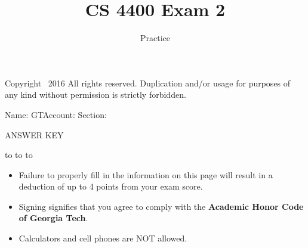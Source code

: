 \documentclass[10pt,a4paper]{exam}
\title{CS 4400 Exam 2}
\date{Practice}
\begin{document}
\maketitle
\thispagestyle{empty}
\firstpageheader{}               {\tiny Copyright \textcopyright\ 2016 All rights reserved. Duplication and/or usage for purposes of any kind without permission is strictly forbidden.}
                {}


\runningheader{}
{\small Name: \underline{\hspace{2.8in}} GTAccount: \underline{\hspace{1.4in}} Section: \underline{\hspace{.5in}}}
{}



\ifprintanswers
\begin{center}
{\LARGE ANSWER KEY}
\end{center}
\vspace{.25in}
\else
\vspace{0.1in}
\hbox to \textwidth{Name: \enspace\hrulefill}
\vspace{0.2in}
\hbox to 
\vspace{0.2in}
\hbox to \textwidth{Signature: \enspace\hrulefill}

\vfill

\begin{itemize}
\item Failure to properly fill in the information on this page will result in a deduction of up to 4 points from your exam score.
\item Signing signifies that you agree to comply with the {\bf Academic Honor Code of Georgia Tech}.
\item Calculators and cell phones are NOT allowed.
\end{itemize}

\fi


\end{document}

